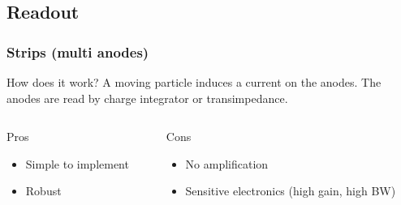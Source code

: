 \subsection{Readout}
\begin{frame}[t]
  \frametitle{Strips (multi anodes)}
  \begin{block}{How does it work?}
    A moving particle induces a current on the anodes. The anodes are read by charge integrator or transimpedance.
  \end{block}
  \begin{columns}[T]
    \begin{column}{0.45\textwidth}
      \begin{block}{Pros}
        \begin{itemize}
          \item Simple to implement
          \item Robust
        \end{itemize}
      \end{block}
    \end{column}
    \begin{column}{0.45\textwidth}
      \begin{block}{Cons}
        \begin{itemize}
          \item No amplification
          \item Sensitive electronics (high gain, high BW)
        \end{itemize}
      \end{block}
    \end{column}
  \end{columns}


\end{frame}
